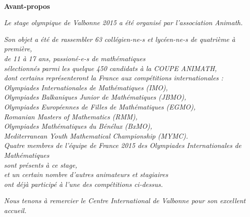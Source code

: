 \pagebreak

\pagestyle{empty}~

 \pagebreak



\clearpage


\begin{flushright}

\textbf{\Large{Avant-propos}}

\bigskip

\emph{Le stage olympique de Valbonne 2015 a été organisé par l'association Animath.}

\bigskip

\emph{Son objet a été de rassembler 63 collégien-ne-s et lycéen-ne-s de quatrième à première, \\ de 11 à 17 ans, passioné-e-s de mathématiques \\ sélectionnés parmi les quelque 450 candidats à la COUPE ANIMATH, \\ dont certains  représenteront la France aux compétitions internationales : \\
Olympiades Internationales de Mathématiques (IMO), \\ Olympiades Balkaniques Junior de Mathématiques (JBMO), \\ Olympiades Européennes de Filles de Mathématiques (EGMO), \\ Romanian Masters of Mathematics (RMM), \\ Olympiades Mathématiques du Bénélux (BxMO), \\ Mediterranean Youth Mathematical Championship (MYMC). \\ Quatre membres de l'équipe de France 2015 des Olympiades Internationales de Mathématiques \\ sont présents à ce stage, \\ et un certain nombre d'autres animateurs et stagiaires \\ ont déjà participé à l'une des compétitions ci-dessus.}
 
\bigskip

\emph{Nous tenons à remercier le Centre International de Valbonne pour son excellent accueil.}
\end{flushright}




\pagebreak

\mbox { }

\pagebreak
